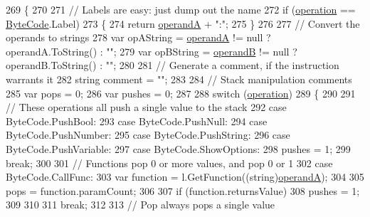 \begin{DoxyCode}
269         \{
270 
271             \textcolor{comment}{// Labels are easy: just dump out the name}
272             \textcolor{keywordflow}{if} (\hyperlink{a00113_a566bf5f7198cc353ea5c3710cb3a31cb}{operation} == \hyperlink{a00045_ad5dfb6ee68ca7469623ad3e459f98894}{ByteCode}.Label)
273             \{
274                 \textcolor{keywordflow}{return} \hyperlink{a00113_ab5d386faa0d3dbc23db80f8e62706afd}{operandA} + \textcolor{stringliteral}{":"};
275             \}
276 
277             \textcolor{comment}{// Convert the operands to strings}
278             var opAString = \hyperlink{a00113_ab5d386faa0d3dbc23db80f8e62706afd}{operandA} != null ? operandA.ToString() : \textcolor{stringliteral}{""};
279             var opBString = \hyperlink{a00113_a56348c6fe7eb919b7277afc06e5b224a}{operandB} != null ? operandB.ToString() : \textcolor{stringliteral}{""};
280 
281             \textcolor{comment}{// Generate a comment, if the instruction warrants it}
282             \textcolor{keywordtype}{string} comment = \textcolor{stringliteral}{""};
283 
284             \textcolor{comment}{// Stack manipulation comments}
285             var pops = 0;
286             var pushes = 0;
287 
288             \textcolor{keywordflow}{switch} (\hyperlink{a00113_a566bf5f7198cc353ea5c3710cb3a31cb}{operation})
289             \{
290 
291                 \textcolor{comment}{// These operations all push a single value to the stack}
292                 \textcolor{keywordflow}{case} ByteCode.PushBool:
293                 \textcolor{keywordflow}{case} ByteCode.PushNull:
294                 \textcolor{keywordflow}{case} ByteCode.PushNumber:
295                 \textcolor{keywordflow}{case} ByteCode.PushString:
296                 \textcolor{keywordflow}{case} ByteCode.PushVariable:
297                 \textcolor{keywordflow}{case} ByteCode.ShowOptions:
298                     pushes = 1;
299                     \textcolor{keywordflow}{break};
300 
301                 \textcolor{comment}{// Functions pop 0 or more values, and pop 0 or 1}
302                 \textcolor{keywordflow}{case} ByteCode.CallFunc:
303                     var \textcolor{keyword}{function} = l.GetFunction((string)\hyperlink{a00113_ab5d386faa0d3dbc23db80f8e62706afd}{operandA});
304 
305                     pops = function.paramCount;
306 
307                     \textcolor{keywordflow}{if} (\textcolor{keyword}{function}.returnsValue)
308                         pushes = 1;
309 
310 
311                     \textcolor{keywordflow}{break};
312 
313                 \textcolor{comment}{// Pop always pops a single value}

\end{DoxyCode}
